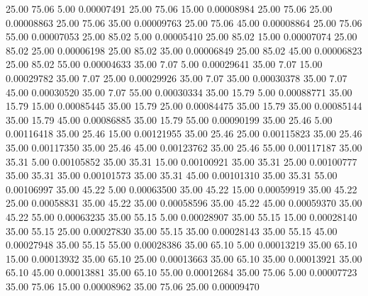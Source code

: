      25.00     75.06      5.00     0.00007491
     25.00     75.06     15.00     0.00008984
     25.00     75.06     25.00     0.00008863
     25.00     75.06     35.00     0.00009763
     25.00     75.06     45.00     0.00008864
     25.00     75.06     55.00     0.00007053
     25.00     85.02      5.00     0.00005410
     25.00     85.02     15.00     0.00007074
     25.00     85.02     25.00     0.00006198
     25.00     85.02     35.00     0.00006849
     25.00     85.02     45.00     0.00006823
     25.00     85.02     55.00     0.00004633
     35.00      7.07      5.00     0.00029641
     35.00      7.07     15.00     0.00029782
     35.00      7.07     25.00     0.00029926
     35.00      7.07     35.00     0.00030378
     35.00      7.07     45.00     0.00030520
     35.00      7.07     55.00     0.00030334
     35.00     15.79      5.00     0.00088771
     35.00     15.79     15.00     0.00085445
     35.00     15.79     25.00     0.00084475
     35.00     15.79     35.00     0.00085144
     35.00     15.79     45.00     0.00086885
     35.00     15.79     55.00     0.00090199
     35.00     25.46      5.00     0.00116418
     35.00     25.46     15.00     0.00121955
     35.00     25.46     25.00     0.00115823
     35.00     25.46     35.00     0.00117350
     35.00     25.46     45.00     0.00123762
     35.00     25.46     55.00     0.00117187
     35.00     35.31      5.00     0.00105852
     35.00     35.31     15.00     0.00100921
     35.00     35.31     25.00     0.00100777
     35.00     35.31     35.00     0.00101573
     35.00     35.31     45.00     0.00101310
     35.00     35.31     55.00     0.00106997
     35.00     45.22      5.00     0.00063500
     35.00     45.22     15.00     0.00059919
     35.00     45.22     25.00     0.00058831
     35.00     45.22     35.00     0.00058596
     35.00     45.22     45.00     0.00059370
     35.00     45.22     55.00     0.00063235
     35.00     55.15      5.00     0.00028907
     35.00     55.15     15.00     0.00028140
     35.00     55.15     25.00     0.00027830
     35.00     55.15     35.00     0.00028143
     35.00     55.15     45.00     0.00027948
     35.00     55.15     55.00     0.00028386
     35.00     65.10      5.00     0.00013219
     35.00     65.10     15.00     0.00013932
     35.00     65.10     25.00     0.00013663
     35.00     65.10     35.00     0.00013921
     35.00     65.10     45.00     0.00013881
     35.00     65.10     55.00     0.00012684
     35.00     75.06      5.00     0.00007723
     35.00     75.06     15.00     0.00008962
     35.00     75.06     25.00     0.00009470
